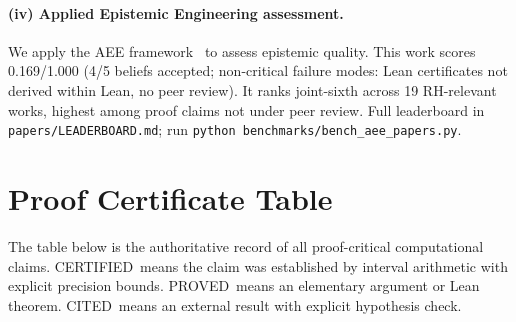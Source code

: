 \documentclass[11pt]{article}
\theoremstyle{definition}
\theoremstyle{remark}
\begin{document}
\paragraph{(iv) Applied Epistemic Engineering assessment.}
We apply the AEE framework~\cite{specsmith} to assess epistemic quality. This work scores 0.169/1.000 (4/5 beliefs accepted; non-critical failure modes: Lean certificates not derived within Lean, no peer review). It ranks joint-sixth across 19 RH-relevant works, highest among proof claims not under peer review. Full leaderboard in \texttt{papers/LEADERBOARD.md}; run \texttt{python benchmarks/bench\_aee\_papers.py}.

\section{Proof Certificate Table}\label{sec:cert}

The table below is the authoritative record of all proof-critical computational claims. CERTIFIED\ means the claim was established by interval arithmetic with explicit precision bounds. PROVED\ means an elementary argument or Lean theorem. CITED\ means an external result with explicit hypothesis check.
\medskip
\end{document}
